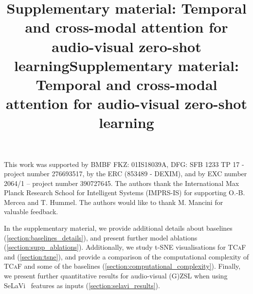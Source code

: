 \documentclass[runningheads]{llncs}
\newcommand{\mypara}[1]{\noindent{\bf{#1}}}
\newcommand{\modelName}{\textsc{TCaF}\xspace}
\begin{document}
\mypara{Acknowledgements:} This work was supported by BMBF FKZ: 01IS18039A, DFG: SFB 1233 TP 17 - project number 276693517, by the ERC (853489 - DEXIM), and by EXC number 2064/1 – project number 390727645. The authors thank the International Max Planck Research School for Intelligent Systems (IMPRS-IS) for supporting O.-B. Mercea and T. Hummel. The authors would like to thank M. Mancini for valuable feedback.










\makeatletter

\makeatother





\pagestyle{headings}
\mainmatter
\def\ECCVSubNumber{6942}  

\title{Supplementary material: Temporal and cross-modal attention for audio-visual zero-shot learning} 

\begin{comment}
\titlerunning{ECCV-22 submission ID \ECCVSubNumber} 
\authorrunning{ECCV-22 submission ID \ECCVSubNumber} 
\author{Anonymous ECCV submission}
\institute{Paper ID \ECCVSubNumber}
\end{comment}










\author{}
\institute{}
\maketitle

\title{Supplementary material: Temporal and cross-modal attention for audio-visual zero-shot learning} 


In the supplementary material, we provide additional details about baselines (\cref{section:baselines_details}), and present further model ablations (\cref{section:supp_ablations}).  Additionally, we study t-SNE visualisations for \modelName and \cite{mercea2022} (\cref{section:tsne}), and provide a comparison of the computational complexity of \modelName and some of the baselines (\cref{section:computational_complexity}). Finally, we present further quantitative results for audio-visual (G)ZSL when using SeLaVi~\cite{asano2020labelling} features as inputs (\cref{section:selavi_results}).
\end{document}
